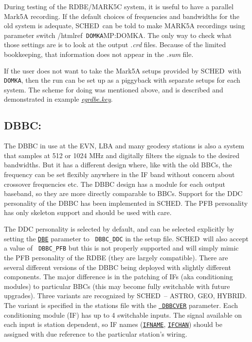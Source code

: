 \documentclass{report}
\newcommand{\sched}{{\sc SCHED}}
\newcommand{\schedb}{{\sc SCHED~}}
\begin{document}
During testing of the RDBE/MARK5C system, it is useful to have a
parallel Mark5A recording.  If the default choices of frequencies and
bandwidths for the old system is adequate, \schedb can be told to make
MARK5A recordings using parameter switch /htmlref{{\tt
DOMKA}}{MP:DOMKA}.  The only way to check what those settings are is
to look at the output {\sl .crd} files.  Because of the limited 
bookkeeping, that information does not appear in the {\sl .sum} file.

If the user does not want to take the Mark5A setups provided by
\schedb with {\tt DOMKA}, then the run can be set up as a piggyback
with separate setups for each system.  The scheme for doing was 
mentioned above, and is described and demonstrated in example
{\href{examples/egrdbe.key}{{\sl egrdbe.key}}}.


\subsection{\label{SSEC:DBBC}DBBC:}

The DBBC in use at the EVN, LBA and many geodesy stations is also a
system that samples at 512 or 1024 MHz and digitally filters the signals
to the desired bandwidths. But it has a different design where, like
with the old BBCs, the frequency can be set flexibly anywhere in the IF
band without concern about crossover frequencies etc.  The DBBC design
has a module for each output baseband, so they are more directly
comparable to BBCs. Support for the DDC personality of the DBBC has
been implemented in \sched.
The PFB personality has only skeleton support and should be used with care.

The DDC personality is selected by default, and can be selected
explicitly by setting the 
{\hyperref[SP:DBE]{{\tt DBE}}} parameter to {\tt
DBBC\_DDC} in the setup file. \schedb will also accept a value of {\tt
DBBC\_PFB} but this is not properly supported and will simply mimic the
PFB personality of the RDBE (they are largely compatible). There are several
different versions of the DBBC being deployed with slightly different
components. The major difference is in the patching of IFs (aka conditioning
modules) to particular BBCs (this may become fully switchable with future
upgrades). Three variants are recognized by \schedb -- ASTRO, GEO, HYBRID. The
variant is specified in the stations file with the {\hyperref[ST:DBBCVER]{{\tt
DBBCVER}}} parameter. Each conditioning module (IF) has up to 4 switchable
inputs. The signal available on each input is station dependent, so IF names
({\hyperref[FQ:IFNAME]{{\tt IFNAME}}}, {\hyperref[SP:IFCHAN]{{\tt IFCHAN}}})
should be assigned with due reference to the particular station's wiring.
\end{document}

